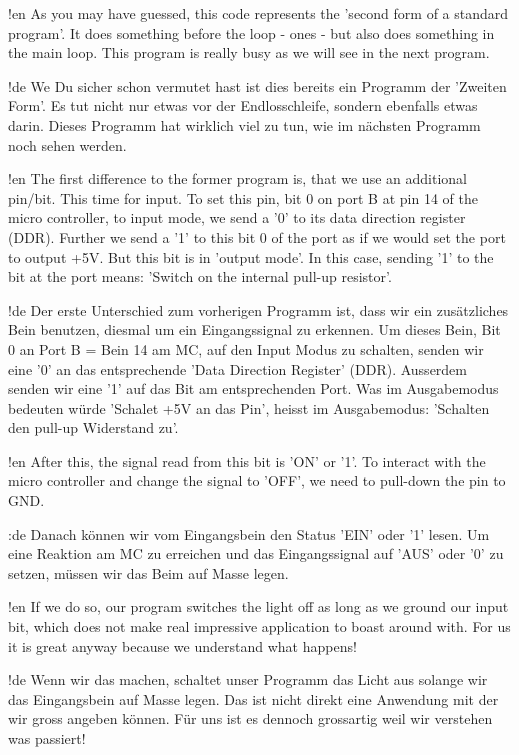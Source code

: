 !en As you may have guessed, this code represents the 'second form of a standard program'. It does something before the loop - ones - but also does something in the main loop. This program is really busy as we will see in the next program.

!de We Du sicher schon vermutet hast ist dies bereits ein Programm der 'Zweiten Form'. Es tut nicht nur etwas vor der Endlosschleife, sondern ebenfalls etwas darin. Dieses Programm hat wirklich viel zu tun, wie im nächsten Programm noch sehen werden.



!en The first difference to the former program is, that we use an additional pin/bit. This time for input. To set this pin, bit 0 on port B at pin 14 of the micro controller, to input mode, we send a '0' to its data direction register (DDR). Further we send a '1' to this bit 0 of the port as if we would set the port to output +5V. But this bit is in 'output mode'. In this case, sending '1' to the bit at the port means: 'Switch on the internal pull-up resistor'.

!de Der erste Unterschied zum vorherigen Programm ist, dass wir ein zusätzliches Bein benutzen, diesmal um ein Eingangssignal zu erkennen. Um dieses Bein, Bit 0 an Port B = Bein 14 am MC, auf den Input Modus zu schalten, senden wir eine '0' an das entsprechende 'Data Direction Register' (DDR). Ausserdem senden wir eine '1' auf das Bit am entsprechenden Port. Was im Ausgabemodus bedeuten würde 'Schalet +5V an das Pin', heisst im Ausgabemodus: 'Schalten den pull-up Widerstand zu'.



!en After this, the signal read from this bit is 'ON' or '1'. To interact with the micro controller and change the signal to 'OFF', we need to pull-down the pin to GND.

:de Danach können wir vom Eingangsbein den Status 'EIN' oder '1' lesen. Um eine Reaktion am MC zu erreichen und das Eingangssignal auf 'AUS' oder '0' zu setzen, müssen wir das Beim auf Masse legen.



!en If we do so, our program switches the light off as long as we ground our input bit, which does not make real impressive application to boast around with. For us it is great anyway because we understand what happens!

!de Wenn wir das machen, schaltet unser Programm das Licht aus solange wir das Eingangsbein auf Masse legen. Das ist nicht direkt eine Anwendung mit der wir gross angeben können. Für uns ist es dennoch grossartig weil wir verstehen was passiert!



